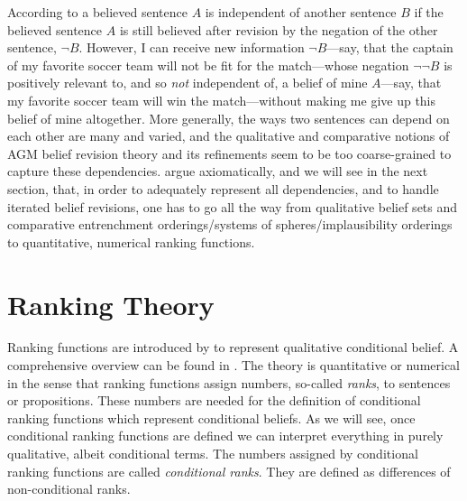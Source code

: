According to \citet{jt07} a believed sentence $A$ is independent of another sentence $B$ if the believed sentence $A$ is still believed after revision by the negation of the other sentence, $\neg B$. However, I can receive new information $\neg B$---say, that the captain of my favorite soccer team will not be fit for the match---whose negation $\neg\neg B$ is positively relevant to, and so \emph{not} independent of, a belief of mine $A$---say, that my favorite soccer team will win the match---without making me give up this belief of mine altogether. More generally, the ways two sentences can depend on each other are many and varied, and the qualitative and comparative notions of AGM belief revision theory and its refinements seem to be too coarse-grained to capture these dependencies. \citet{hs08} argue axiomatically, and we will see in the next section, that, in order to adequately represent all dependencies, and to handle iterated belief revisions, one has to go all the way from qualitative belief sets and comparative entrenchment orderings/systems of spheres/implausibility orderings to quantitative, numerical ranking functions.



\section{Ranking Theory}

Ranking functions are introduced by \citet{s88,s90} to represent qualitative conditional belief. A comprehensive overview can be found in \citet{s12}. The theory is quantitative or numerical in the sense that ranking functions assign numbers, so-called \emph{ranks}, to sentences or propositions. These numbers are needed for the definition of conditional ranking functions which represent conditional beliefs. As we will see, once conditional ranking functions are defined we can interpret everything in purely qualitative, albeit conditional terms. The numbers assigned by conditional ranking functions are called \emph{conditional ranks}. They are defined as differences of non-conditional ranks.%


